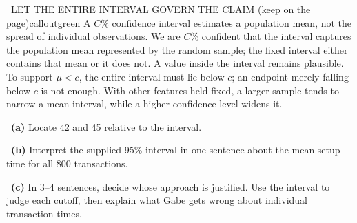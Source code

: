 \documentclass[11pt]{article}
\begin{document}
\begin{callout}{\IconBook\ LET THE ENTIRE INTERVAL GOVERN THE CLAIM (keep on the page)}{calloutgreen}
A $C\%$ confidence interval estimates a population mean, not the spread of individual observations.
We are $C\%$ confident that the interval captures the population mean represented by the random sample;
the fixed interval either contains that mean or it does not. A value inside the interval remains plausible.
To support $\mu<c$, the entire interval must lie below $c$; an endpoint merely falling below $c$ is not enough.
With other features held fixed, a larger sample tends to narrow a mean interval, while a higher confidence
level widens it.
\end{callout}

~\textbf{(a)} Locate 42 and 45 relative to the interval.\par
{}

~\textbf{(b)} Interpret the supplied 95\% interval in one sentence about the mean setup time for all 800 transactions.\par
{}

~\textbf{(c)} In 3--4 sentences, decide whose approach is justified. Use the interval to judge each cutoff, then explain what Gabe gets wrong about individual transaction times.\par
{}
\end{document}

